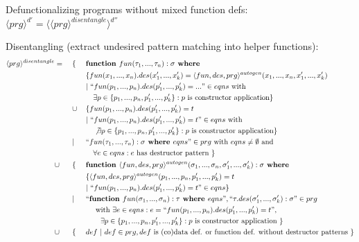 \documentclass[11pt]{article} %
\begin{document}
Defunctionalizing programs without mixed function defs: $\langle prg \rangle^{d'} = \langle \langle prg \rangle^{disentangle} \rangle^{d''}$

Disentangling (extract undesired pattern matching into helper functions):
\begin{alignat*}{3}
\langle prg \rangle^{disentangle} & = ~&&\{ ~&& \textrm{\textbf{function }} fun(\tau_1, ..., \tau_n): \sigma \textrm{\textbf{ where }} \\
& && && \{ fun(x_1, ..., x_n).des(x'_1, ..., x'_k) = \langle fun, des, prg \rangle^{autogen}(x_1, ..., x_n, x'_1, ..., x'_k) \\
& && && | ~ `` fun(p_1, ..., p_n).des(p'_1, ..., p'_k) = ... " \in eqns \textrm{ with } \\
& && &&\quad \exists p \in \{p_1, ..., p_n, p'_1, ..., p'_k\}: p \textrm{ is constructor application} \} \\
& && \cup && \{ fun(p_1, ..., p_n).des(p'_1, ..., p'_k) = t \\
& && && | ~ `` fun(p_1, ..., p_n).des(p'_1, ..., p'_k) = t " \in eqns \textrm{ with } \\
& && &&\quad \not\exists p \in \{p_1, ..., p_n, p'_1, ..., p'_k\}: p \textrm{ is constructor application} \} \\
& && | && `` fun (\tau_1, ..., \tau_n): \sigma \textrm{\textbf{ where }} eqns " \in prg \textrm{ with } eqns \neq \emptyset \textrm{ and } \\
& && &&\quad \forall e \in eqns: e \textrm{ has destructor pattern }  \} \\
&\cup && \{ && \textrm{\textbf{function }} \langle fun, des, prg \rangle^{autogen}(\sigma_1, ..., \sigma_n, \sigma'_1, ..., \sigma'_k): \sigma \textrm{\textbf{ where }} \\
& && && \{ \langle fun, des, prg \rangle^{autogen}(p_1, ..., p_n, p'_1, ..., p'_k) = t \\
& && && | ~ `` fun(p_1, ..., p_n).des(p'_1, ..., p'_k) = t " \in eqns \} \\
& && | && `` \textrm{\textbf{function }} fun(\sigma_1, ..., \sigma_n): \tau \textrm{\textbf{ where }} eqns ", `` \tau.des(\sigma'_1,...,\sigma'_k): \sigma " \in prg \\
& && &&\quad \textrm{ with } \exists e \in eqns: e = `` fun(p_1, ..., p_n).des(p'_1,..., p'_k) = t ", \\
& && &&\qquad \exists p \in \{p_1, ..., p_n, p'_1, ..., p'_k\}: p \textrm{ is constructor application } \} \\
& \cup && \{ && def ~ | ~ def \in prg, def \textrm{ is (co)data def. or function def. without destructor patterns } \}
\end{alignat*}
\end{document}
